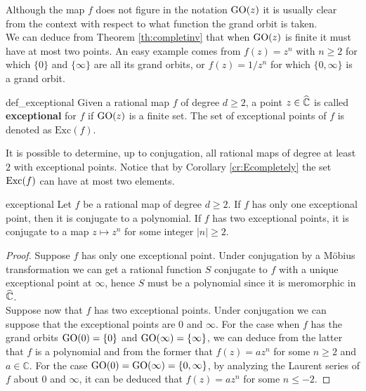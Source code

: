 Although the map $f$ does not figure in the notation $\text{GO}(z)$ it is usually clear from the context with respect to what function the grand orbit is taken.\\

We can deduce from Theorem \ref{th:completinv} that when $\text{GO}(z)$ is finite it must have at most two points. An easy example comes from $f(z)=z^n$ with $n\geq 2$ for which $\{0\}$ and $\{\infty\}$ are all its grand orbits, or $f(z)=1/z^n$ for which $\{0,\infty\}$ is a grand orbit.\\

\begin{mydef}{}{def_exceptional}
Given a rational map $f$ of degree $d\geq 2$, a point $z\in \widehat{\mathbb{C}}$ is called {\bf exceptional} for $f$ if $\text{GO}(z)$ is a finite set. The set of exceptional points of $f$ is denoted as $\text{Exc}(f)$. 
\end{mydef}

It is possible to determine, up to conjugation, all rational maps of degree at least $2$ with exceptional points. Notice that by Corollary \ref{cr:Ecompletely} the set $\text{Exc}(f)$ can have at most two elements.\\

\begin{mytheo}{}{exceptional}
Let $f$ be a rational map of degree $d\geq 2$. If $f$ has only one exceptional point, then it is conjugate to a polynomial. If $f$ has two exceptional points, it is conjugate to a map $z\mapsto z^n$ for some integer $|n|\geq 2$.
\end{mytheo}

\begin{proof}
Suppose $f$ has only one exceptional point. Under conjugation by a Möbius transformation we can get a rational function $S$ conjugate to $f$ with a unique exceptional point at $\infty$, hence $S$ must be a polynomial since it is meromorphic in $\widehat{\mathbb{C}}$.\\

Suppose now that $f$ has two exceptional points. Under conjugation we can suppose that the exceptional points are $0$ and $\infty$. For the case when $f$ has the grand orbits $\text{GO}(0)=\{0\}$ and $\text{GO}(\infty)=\{\infty\}$, we can deduce from the latter that $f$ is a polynomial and from the former that $f(z) = az^n$ for some $n\geq 2$ and $a\in \mathbb{C}$. For the case $\text{GO}(0)=\text{GO}(\infty)=\{0,\infty\}$, by analyzing the Laurent series of $f$ about $0$ and $\infty$, it can be deduced that $f(z) = az^n$ for some $n\leq -2$.  
\end{proof}

